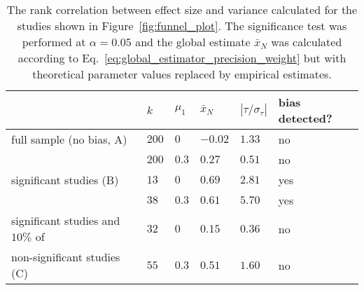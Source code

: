 \begin{table}[h!]
  \begin{center}
    \begin{tabular}{ >{\raggedright\let\\\tabularnewline}p{} | >{\raggedleft\let\\\tabularnewline}p{}| >{\raggedleft\let\\\tabularnewline}p{} | >{\raggedleft\let\\\tabularnewline}p{} | >{\raggedleft\let\\\tabularnewline}p{} | >{\raggedright\let\\\tabularnewline}p{}} 
    \hline
     & $k$\TBstrut & $\mu_1$ & $\bar{x}_N$ & $|\tau/\sigma_{\tau}|$ & bias detected?\\ 
    \hline
    full sample (no bias, A)\Tstrut & $200$ & $0$ & $-0.02$  & $1.33$ & no \\ 
    & $200$\Bstrut & $0.3$ & $0.27$  & $0.51$ & no\\
    \hline
    significant studies (B)\Tstrut& $13$ & $0$ & $0.69$ & $2.81$ & yes \\
    & $38$\Bstrut & $0.3$ & $0.61$ & $5.70$ & yes \\
    \hline
    significant studies and $10\%$ of\Tstrut & $32$ & $0$ & $0.15$ & $0.36$ & no \\
    non-significant studies (C) & $55$\Bstrut & $0.3$ & $0.51$ & $1.60$ & no\\
 \hline
\end{tabular}
    \caption[Rank correlation test to detect publication bias.]{The rank correlation between effect size and variance calculated for the studies shown in Figure~\ref{fig:funnel_plot}. The significance test was performed at $\alpha = 0.05$ and the global estimate $\bar{x}_N$ was calculated according to Eq.~\ref{eq:global_estimator_precision_weight} but with theoretical parameter values replaced by empirical estimates.}
    \label{tab:rank_correlation}
  \end{center}
\end{table}
